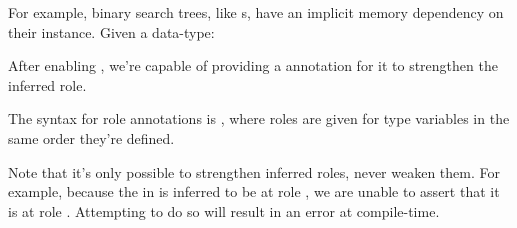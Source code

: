 \documentclass[book.tex]{subfiles}
\begin{document}
For example, binary search trees, like s, have an implicit memory
dependency on their  instance. Given a data-type:


After enabling , we're capable of providing a annotation
for it to strengthen the inferred role.


The syntax for role annotations is ,
where roles are given for type variables in the same order they're defined.

Note that it's only possible to strengthen inferred roles, never weaken
them. For example, because the  in  is inferred to be at role
, we are unable to assert that it is at role .
Attempting to do so will result in an error at compile-time.
\end{document}
